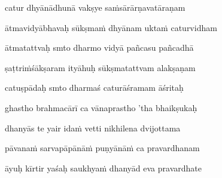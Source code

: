 catur dhyānādhunā vakṣye sa\.msārārṇavatāraṇam\thinspace{\dandab} \dontdisplaylinenum

ātmavidyābhavaḥ sūkṣma\.m dhyānam ukta\.m caturvidham \veg\dontdisplaylinenum

ātmatattvaḥ smto dharmo vidyā pañcasu pañcadhā\thinspace{\dandab} \dontdisplaylinenum

ṣaṭtri\.mśākṣaram ityāhuḥ sūkṣmatattvam alakṣaṇam \veg\dontdisplaylinenum

catuṣpādaḥ smto dharmaś caturāśramam āśritaḥ\thinspace{\dandab} \dontdisplaylinenum

ghastho brahmacārī ca vānaprastho 'tha bhaikṣukaḥ \veg\dontdisplaylinenum

dhanyās te yair ida\.m vetti nikhilena dvijottama\thinspace{\dandab} \dontdisplaylinenum

pāvana\.m sarvapāpānā\.m puṇyānā\.m ca pravardhanam \veg\dontdisplaylinenum

āyuḥ kīrtir yaśaḥ saukhya\.m dhanyād eva pravardhate\thinspace{\dandab} \dontdisplaylinenum

